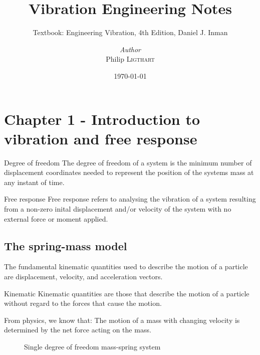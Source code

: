 \documentclass[a4paper, 12pt]{report}
\title{Vibration Engineering Notes}
\subtitle{Textbook: Engineering Vibration, 4th Edition, Daniel J. Inman}
\author{\textit{Author}\\Philip \textsc{Ligthart}}
\date{\today}
\begin{document}
    \maketitle
    \romantableofcontents

    \chapter{Chapter 1 - Introduction to vibration and free response}

      \begin{fmd-definition}{Degree of freedom}
        The degree of freedom of a system is the minimum number of displacement coordinates needed to represent the position of the systems mass at any instant of time.
      \end{fmd-definition}

      \begin{fmd-definition}{Free response}
        Free response refers to analysing the vibration of a system resulting from a non-zero inital displacement and/or velocity of the system with no external force or moment applied.
      \end{fmd-definition}
  
      \section{The spring-mass model}
        The fundamental kinematic quantities used to describe the motion of a particle are displacement, velocity, and acceleration vectors.

        \begin{fmd-definition}{Kinematic}
          Kinematic quantities are those that describe the motion of a particle without regard to the forces that cause the motion.
        \end{fmd-definition}

        From physics, we know that: The motion of a mass with changing velocity is determined by the net force acting on the mass.
        \begin{figure}
          \centering
          \caption{Single degree of freedom mass-spring system}\label{fig:single-dof-mass-spring}
        \end{figure}
\end{document}
